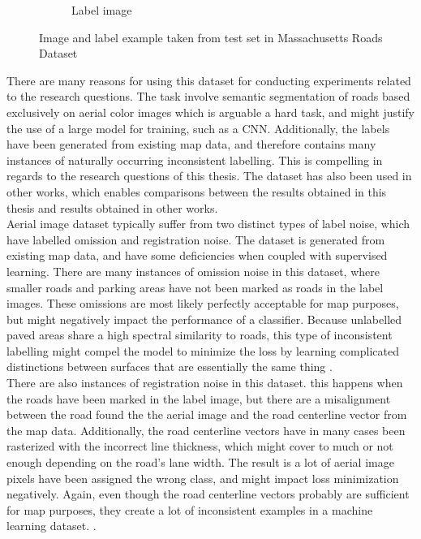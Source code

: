 \begin{figure}
\begin{subfigure}{0.48\textwidth}
\caption{Label image} \label{fig:mass_roads_example_label}
\end{subfigure}
\hspace*{\fill} %
\caption{Image and label example taken from test set in Massachusetts Roads Dataset} \label{fig:mass_roads_example}
\end{figure}


There are many reasons for using this dataset for conducting experiments related to the research questions.  The task involve semantic segmentation of roads based exclusively on aerial color images which is arguable a hard task, and might justify the use of a large model for training, such as a \ac{CNN}. Additionally, the labels have been generated from existing map data, and therefore contains many instances of naturally occurring inconsistent labelling. This is compelling in regards to the research questions of this thesis. The dataset has also been used in other works, which enables comparisons between the results obtained in this thesis and results obtained in other works. \\

Aerial image dataset typically suffer from two distinct types of label noise, which \cite{Mnih_aerial_images_noisy} have labelled omission and registration noise. The dataset is generated from existing map data, and have some deficiencies when coupled with supervised learning. There are many instances of omission noise in this dataset, where smaller roads and parking areas have not been marked as roads in the label images. These omissions are most likely perfectly acceptable for map purposes, but might negatively impact the performance of a classifier.  Because unlabelled paved areas share a high spectral similarity to roads, this type of inconsistent labelling might compel the model to minimize the loss by learning complicated distinctions between surfaces that are essentially the same thing .\\

There are also instances of registration noise in this dataset. this happens when the roads have been marked in the label image, but there are a misalignment between the road found the the aerial image and the road centerline vector from the map data. Additionally, the road centerline vectors have in many cases been rasterized with the incorrect line thickness, which might cover to much or not enough depending on the road's lane width. The result is a lot of aerial image pixels have been assigned the wrong class, and might impact loss minimization negatively. Again, even though the road centerline vectors probably are sufficient for map purposes, they create a lot of inconsistent examples in a machine learning dataset. .


